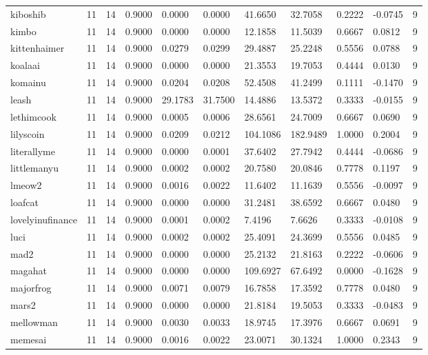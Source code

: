 \begin{table}[htbp]
\begin{tabular}{lllllllllll}
kiboshib & 11 & 14 & 0.9000 & 0.0000 & 0.0000 & 41.6650 & 32.7058 & 0.2222 & -0.0745 & 9 \\
kimbo & 11 & 14 & 0.9000 & 0.0000 & 0.0000 & 12.1858 & 11.5039 & 0.6667 & 0.0812 & 9 \\
kittenhaimer & 11 & 14 & 0.9000 & 0.0279 & 0.0299 & 29.4887 & 25.2248 & 0.5556 & 0.0788 & 9 \\
koalaai & 11 & 14 & 0.9000 & 0.0000 & 0.0000 & 21.3553 & 19.7053 & 0.4444 & 0.0130 & 9 \\
komainu & 11 & 14 & 0.9000 & 0.0204 & 0.0208 & 52.4508 & 41.2499 & 0.1111 & -0.1470 & 9 \\
leash & 11 & 14 & 0.9000 & 29.1783 & 31.7500 & 14.4886 & 13.5372 & 0.3333 & -0.0155 & 9 \\
lethimcook & 11 & 14 & 0.9000 & 0.0005 & 0.0006 & 28.6561 & 24.7009 & 0.6667 & 0.0690 & 9 \\
lilyscoin & 11 & 14 & 0.9000 & 0.0209 & 0.0212 & 104.1086 & 182.9489 & 1.0000 & 0.2004 & 9 \\
literallyme & 11 & 14 & 0.9000 & 0.0000 & 0.0001 & 37.6402 & 27.7942 & 0.4444 & -0.0686 & 9 \\
littlemanyu & 11 & 14 & 0.9000 & 0.0002 & 0.0002 & 20.7580 & 20.0846 & 0.7778 & 0.1197 & 9 \\
lmeow2 & 11 & 14 & 0.9000 & 0.0016 & 0.0022 & 11.6402 & 11.1639 & 0.5556 & -0.0097 & 9 \\
loafcat & 11 & 14 & 0.9000 & 0.0000 & 0.0000 & 31.2481 & 38.6592 & 0.6667 & 0.0480 & 9 \\
lovelyinufinance & 11 & 14 & 0.9000 & 0.0001 & 0.0002 & 7.4196 & 7.6626 & 0.3333 & -0.0108 & 9 \\
luci & 11 & 14 & 0.9000 & 0.0002 & 0.0002 & 25.4091 & 24.3699 & 0.5556 & 0.0485 & 9 \\
mad2 & 11 & 14 & 0.9000 & 0.0000 & 0.0000 & 25.2132 & 21.8163 & 0.2222 & -0.0606 & 9 \\
magahat & 11 & 14 & 0.9000 & 0.0000 & 0.0000 & 109.6927 & 67.6492 & 0.0000 & -0.1628 & 9 \\
majorfrog & 11 & 14 & 0.9000 & 0.0071 & 0.0079 & 16.7858 & 17.3592 & 0.7778 & 0.0480 & 9 \\
mars2 & 11 & 14 & 0.9000 & 0.0000 & 0.0000 & 21.8184 & 19.5053 & 0.3333 & -0.0483 & 9 \\
mellowman & 11 & 14 & 0.9000 & 0.0030 & 0.0033 & 18.9745 & 17.3976 & 0.6667 & 0.0691 & 9 \\
memesai & 11 & 14 & 0.9000 & 0.0016 & 0.0022 & 23.0071 & 30.1324 & 1.0000 & 0.2343 & 9 \\

\end{tabular}
\end{table}
